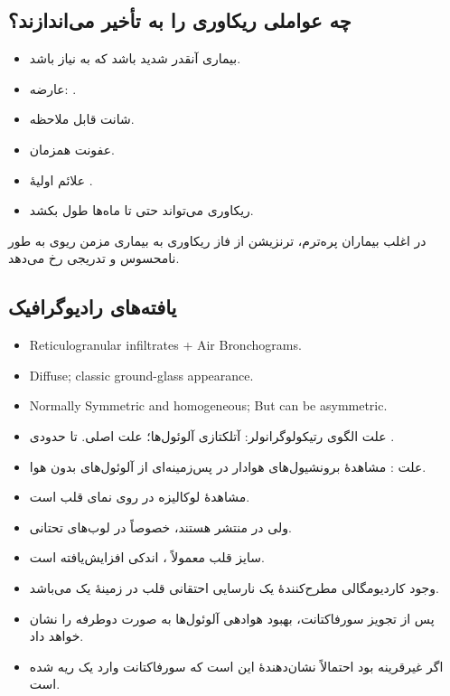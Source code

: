 \documentclass[12pt,a4paper]{article}
\begin{document}
\subsection*{چه عواملی ریکاوری را به تأخیر می‌اندازند؟}
\begin{itemize}
\item بیماری آنقدر شدید باشد که به  نیاز باشد.
\item عارضه: .
\item شانت  قابل ملاحظه.
\item عفونت همزمان.
\item علائم اولیهٔ .
\item ریکاوری می‌تواند حتی تا ماه‌ها طول بکشد.
\end{itemize}

در اغلب بیماران پره‌ترم، ترنزیشن از فاز ریکاوری  به بیماری مزمن ریوی به طور نامحسوس و تدریجی رخ می‌دهد.
\subsection*{یافته‌های رادیوگرافیک}
\begin{latin}
\begin{itemize}
\item Reticulogranular infiltrates + Air Bronchograms.
\item Diffuse; classic ground-glass appearance.
\item Normally Symmetric and homogeneous; But can be asymmetric.
\end{itemize}
\end{latin}
\begin{itemize}
\item علت الگوی رتیکولوگرانولر: آتلکتازی آلوئول‌ها؛ علت اصلی. تا حدودی .
\item علت : مشاهدهٔ برونشیول‌های هوادار در پس‌زمینه‌ای از آلوئول‌های بدون هوا.
\item مشاهدهٔ  لوکالیزه در  روی نمای قلب  است.
\item ولی در  منتشر هستند، خصوصاً در لوب‌های تحتانی.
\item سایز قلب معمولاً ، اندکی افزایش‌یافته است.
\item وجود کاردیومگالی مطرح‌کنندهٔ یک نارسایی احتقانی قلب در زمینهٔ یک  می‌باشد.
\item پس از تجویز سورفاکتانت،  بهبود هوادهی آلوئول‌ها به صورت دوطرفه را نشان خواهد داد.
\item اگر غیرقرینه بود احتمالاً نشان‌دهندهٔ این است که سورفاکتانت وارد یک ریه شده است.
\end{itemize}
\end{document}
